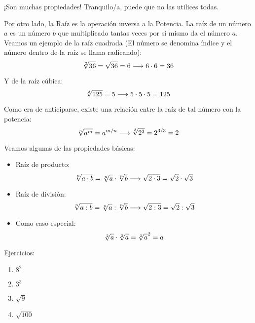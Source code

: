 ¡Son muchas propiedades! Tranquilo/a, puede que no las utilices todas.\\
\medskip

Por otro lado, la Raíz es la operación inversa a la Potencia. La raíz de un número $a$ es un número $b$ que multiplicado tantas veces por sí mismo da el número $a$. Veamos un ejemplo de la raíz cuadrada (El número se denomina índice y el número dentro de la raíz se llama radicando): \\


\begin{equation}
\notag
\sqrt[2]{36}=\sqrt{36}=6 \longrightarrow 6\cdot 6 = 36 
\end{equation} 

Y de la raíz cúbica: \\
\begin{equation}
\notag
\sqrt[3]{125}=5 \longrightarrow 5\cdot 5 \cdot 5 = 125 
\end{equation}


Como era de anticiparse, existe una relación entre la raíz de tal número con la potencia:\\

\begin{equation}
\notag
\sqrt[n]{a^m}=a^{m/n} \longrightarrow \sqrt[3]{2^3}=2^{3/3}=2     
\end{equation}



Veamos algunas de las propiedades básicas: \\

\begin{itemize}
    \item Raíz de producto: 
    \begin{equation}
        \notag
        \sqrt[n]{a\cdot b} = \sqrt[n]{a} \cdot \sqrt[n]{b} \longrightarrow \sqrt{2\cdot 3} = \sqrt{2} \cdot \sqrt{3}
    \end{equation}
    
    \item Raíz de división: 
    \begin{equation}
        \notag
        \sqrt[n]{a: b} = \sqrt[n]{a} : \sqrt[n]{b} \longrightarrow \sqrt{2: 3} = \sqrt{2} : \sqrt{3}
    \end{equation}
    
    \item Como caso especial:
      \begin{equation}
        \notag
         \sqrt[2]{a}\cdot \sqrt[2]{a}=\sqrt[2]{a}^2 = a     
            \end{equation}

\end{itemize}

\medskip
Ejercicios:

\begin{enumerate}
\renewcommand{\labelenumi}{{\theenumi})}
\item $8^2$
\item $3^3$
\item $\sqrt{9}$
\item $\sqrt{100}$

\end{enumerate}